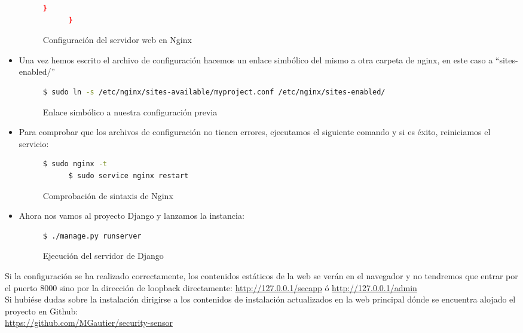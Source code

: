 \begin{itemize}
\begin{figure}[H]
\begin{lstlisting}[language=bash]
        }
      }
    \end{lstlisting}
    \caption{Configuración del servidor web en Nginx}
  \end{figure}
\item Una vez hemos escrito el archivo de configuración hacemos un enlace simbólico del mismo a otra carpeta de nginx, en este caso a ``sites-enabled/''
  \begin{figure}[H]
    \begin{lstlisting}[language=bash]
      $ sudo ln -s /etc/nginx/sites-available/myproject.conf /etc/nginx/sites-enabled/
    \end{lstlisting}
    \caption{Enlace simbólico a nuestra configuración previa}
  \end{figure}
\item Para comprobar que los archivos de configuración no tienen errores, ejecutamos el siguiente comando y si es éxito, reiniciamos el servicio:
  \begin{figure}[H]
    \begin{lstlisting}[language=bash]
      $ sudo nginx -t
      $ sudo service nginx restart
    \end{lstlisting}
    \caption{Comprobación de sintaxis de Nginx}
  \end{figure}
\item Ahora nos vamos al proyecto Django y lanzamos la instancia:
  \begin{figure}[H]
    \begin{lstlisting}[language=bash]
      $ ./manage.py runserver
    \end{lstlisting}
    \caption{Ejecución del servidor de Django}
  \end{figure}
\end{itemize}

Si la configuración se ha realizado correctamente, los contenidos estáticos de la web se verán en el navegador y no tendremos que entrar por el puerto 8000 sino por la dirección de loopback directamente: \href{http://127.0.0.1/secapp}{http://127.0.0.1/secapp} ó \href{http://127.0.0.1/admin}{http://127.0.0.1/admin}\\

Si hubiése dudas sobre la instalación dirigirse a los contenidos de instalación actualizados en la web principal dónde se encuentra alojado el proyecto en Github: \\ \href{https://github.com/MGautier/security-sensor}{https://github.com/MGautier/security-sensor}
